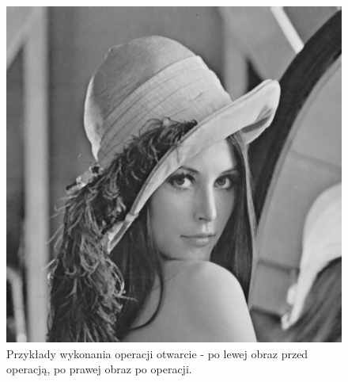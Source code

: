 \documentclass{article}
\begin{document}
\begin{figure}[!htb]
\includegraphics[scale=0.2]{img/Otwarcie_Obrazu_lena_8bit.png} 
\caption{Przykłady wykonania operacji otwarcie - po lewej obraz przed operacją, po prawej obraz po operacji. }
\end{figure}

\FloatBarrier
\end{document}
